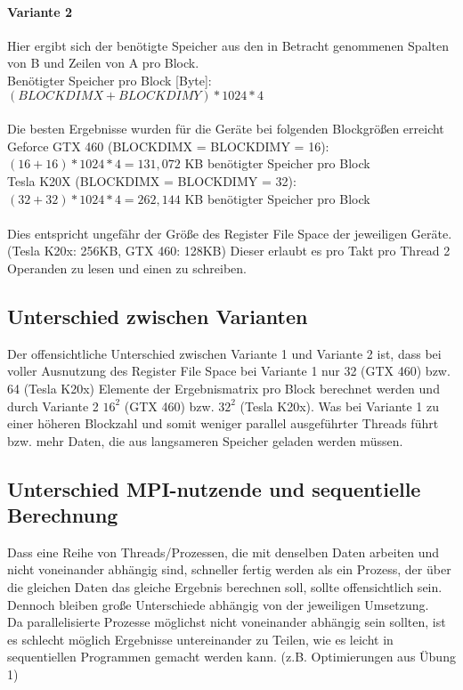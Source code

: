 \paragraph{Variante 2} Hier ergibt sich der benötigte Speicher aus den in Betracht genommenen Spalten von B und Zeilen von A pro Block. \\
Benötigter Speicher pro Block [Byte]: $(BLOCKDIMX+BLOCKDIMY) * 1024 * 4$\\\\
Die besten Ergebnisse wurden für die Geräte bei folgenden Blockgrößen erreicht \\
Geforce GTX 460 (BLOCKDIMX = BLOCKDIMY = 16): $(16+16) * 1024 * 4 = 131,072$ KB benötigter Speicher pro Block \\
Tesla K20X (BLOCKDIMX = BLOCKDIMY = 32): $(32+32) * 1024 * 4 = 262,144$ KB benötigter Speicher pro Block \\
\\
Dies entspricht ungefähr der Größe des Register File Space der jeweiligen Geräte. (Tesla K20x: 256KB, GTX 460: 128KB) Dieser erlaubt es pro Takt pro Thread 2 Operanden zu lesen und einen zu schreiben. 

\subsection{Unterschied zwischen Varianten}
Der offensichtliche Unterschied zwischen Variante 1 und Variante 2 ist, dass bei voller Ausnutzung des Register File Space bei Variante 1 nur 32 (GTX 460) bzw. 64 (Tesla K20x) Elemente der Ergebnismatrix pro Block berechnet werden und durch Variante 2 $16^2$ (GTX 460) bzw. $32^2$ (Tesla K20x). Was bei Variante 1 zu einer höheren Blockzahl und somit weniger parallel ausgeführter Threads führt bzw. mehr Daten, die aus langsameren Speicher geladen werden müssen.

\subsection{Unterschied MPI-nutzende und sequentielle Berechnung}
Dass eine Reihe von Threads/Prozessen, die mit denselben Daten arbeiten und nicht voneinander abhängig sind, schneller fertig werden als ein Prozess, der über die gleichen Daten das gleiche Ergebnis berechnen soll, sollte offensichtlich sein. Dennoch bleiben große Unterschiede abhängig von der jeweiligen Umsetzung.\\
Da parallelisierte Prozesse möglichst nicht voneinander abhängig sein sollten, ist es schlecht möglich Ergebnisse untereinander zu Teilen, wie es leicht in sequentiellen Programmen gemacht werden kann. (z.B. Optimierungen aus Übung 1)
